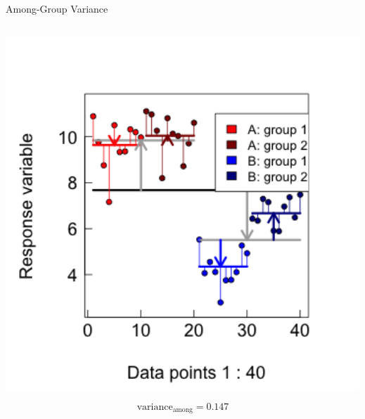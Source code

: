 \documentclass{beamer}
\begin{document}
\begin{frame}{Among-Group Variance}
\begin{columns}[onlytextwidth]
\begin{column}{0.5\textwidth}
\begin{center}
        \includegraphics[width=0.999\textwidth]{lectures/day_1_intro_to_mems/figures/unnamed-chunk-36-1.png}
      \end{center}
        \[ \text{variance}_{\text{among}} = 0.147 \]
    \end{column}
  \end{columns}
  
\end{frame}
\end{document}
